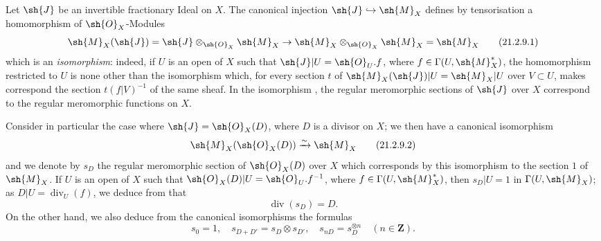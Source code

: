 \begin{env}[21.2.9]
\label{IV.21.2.9}
Let $\sh{J}$ be an invertible fractionary Ideal on $X$.
The canonical injection $\sh{J}\hookrightarrow\sh{M}_X$ defines by tensorisation a homomorphism of $\sh{O}_X$-Modules
\[
\label{IV.21.2.9.1}
  \sh{M}_X(\sh{J})=\sh{J}\otimes_{\sh{O}_X}\sh{M}_X\to\sh{M}_X\otimes_{\sh{O}_X}\sh{M}_X=\sh{M}_X
  \tag{21.2.9.1}
\]
which is an \emph{isomorphism}:
indeed, if $U$ is an open of $X$ such that $\sh{J}|U=\sh{O}_U.f$, where $f\in\Gamma(U,\sh{M}_X^*)$, the homomorphism  restricted to $U$ is none other than the isomorphism which, for every section $t$ of $\sh{M}_X(\sh{J})|U=\sh{M}_X|U$ over $V\subset U$, makes correspond the section $t(f|V)^{-1}$ of the same sheaf.
In the isomorphism , the regular meromorphic sections of $\sh{J}$ over $X$ correspond to the regular meromorphic functions on $X$.

Consider in particular the case where $\sh{J}=\sh{O}_X(D)$, where $D$ is a divisor on $X$;
we then have a canonical isomorphism
\[
\label{IV.21.2.9.2}
  \sh{M}_X(\sh{O}_X(D))\xrightarrow{\sim}\sh{M}_X
  \tag{21.2.9.2}
\]
and we denote by $s_D$ the regular meromorphic section of $\sh{O}_X(D)$ over $X$ which corresponds by this isomorphism to the section $1$ of $\sh{M}_X$.
If $U$ is an open of $X$ such that $\sh{O}_X(D)|U=\sh{O}_U.f^{-1}$, where $f\in\Gamma(U,\sh{M}_X^*)$, then $s_D|U=1$ in $\Gamma(U,\sh{M}_X)$;
as $D|U=\operatorname{div}_U(f)$, we deduce from  that
\[
\label{IV.21.2.9.3}
  \operatorname{div}(s_D)=D.
  \tag{21.2.9.3}
\]
On the other hand, we also deduce from the canonical isomorphisms  the formulas
\[
\label{IV.21.2.9.4}
  s_0=1,\quad s_{D+D'}=s_D\otimes s_{D'},\quad s_{nD}=s_D^{\otimes n}\quad (n\in\mathbf{Z}).
  \tag{21.2.9.4}
\]
\end{env}

